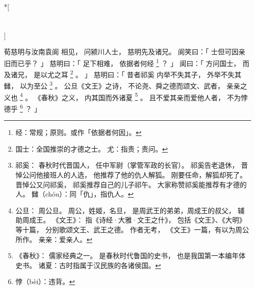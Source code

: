 
\switchcolumn[0]*[\section{}]

荀慈明与汝南袁阆
相见，
问颍川人士，
慈明先及诸兄。
阆笑曰：「
    士但可因亲旧而已乎？
」
慈明曰：「
    足下相难，
    依据者何经%
    \footnote{%
        经：常规；原则。或作「依据者何因」。
    }%
    ？
」
阆曰：「
    方问国士，
    而及诸兄，
    是以尤之耳%
    \footnote{%
        国士：全国推崇的才德之士。
        尤：指责；责问。
    }%
    。
」
慈明曰：「
    昔者祁奚
    内举不失其子，
    外举不失其雠，
    以为至公%
    \footnote{%
        祁奚：
            春秋时代晋国人，
            任中军尉（掌管军政的长官）。
            祁奚告老退休，
            晋悼公问他接班人的人选，
            他推荐了他的仇人解狐。
            刚要任命，解狐却死了。
            晋悼公又问祁奚，
            祁奚推荐自己的儿子祁午。
            大家称赞祁奚能推荐有才德的人。
        雠（chóu）：同「仇」，指仇人。
    }%
    。
    公旦《文王》之诗，
    不论尧、舜之德而颂文、武者，
    亲亲之义也%
    \footnote{%
        公旦：
            周公旦。
            周公，姓姬，名旦，
            是周武王的弟弟，周成王的叔父，
            辅助周成王。
        《文王》：
            指《诗经·大雅·文王之什》，
            包括《文王》、《大明》等十篇，
            分别歌颂文王、武王之德。
            作者无考，
            《文王》一篇，有以为周公所作。
        亲亲：爱亲人。
    }%
    。
    《春秋》之义，
    内其国而外诸夏%
    \footnote{%
        《春秋》：
            儒家经典之一。
            是春秋时代鲁国的史书，
            也是我国第一本编年体史书。
        诸夏：古时指属于汉民族的各诸侯国。
    }%
    。
    且不爱其亲而爱他人者，
    不为悖德乎%
    \footnote{%
        悖（bèi）：违背。
    }%
    ？
」

\switchcolumn



